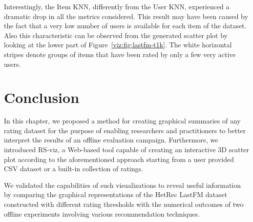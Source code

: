 Interestingly, the Item KNN, differently from the User KNN, experienced a dramatic drop in all the metrics considered. This result may have been caused by the fact that a very low number of users is available for each item of the dataset. Also this characteristic can be observed from the generated scatter plot by looking at the lower part of Figure~\ref{viz:fig:lastfm-t1k}. The white horizontal stripes denote groups of items that have been rated by only a few very active users.


\section{Conclusion}
\label{viz:sec:conclusion}

In this chapter, we proposed a method for creating graphical summaries of any rating dataset for the purpose of enabling researchers and practitioners to better interpret the results of an offline evaluation campaign. Furthermore, we introduced RS-viz, a Web-based tool capable of creating an interactive 3D scatter plot according to the aforementioned approach starting from a user provided CSV dataset or a built-in collection of ratings.

We validated the capabilities of such visualizations to reveal useful information by comparing the graphical representations of the HetRec LastFM dataset constructed with different rating thresholds with the numerical outcomes of two offline experiments involving various recommendation techniques.
